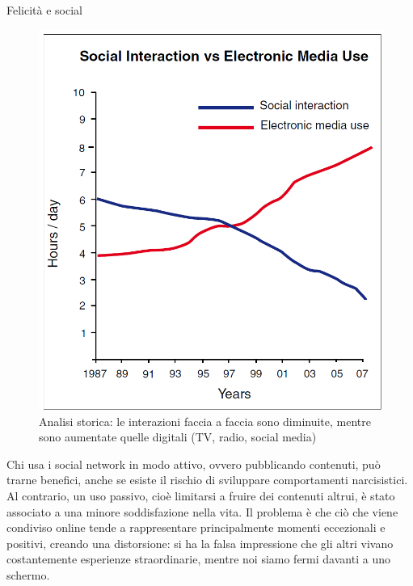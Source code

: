 \documentclass[12pt]{book} %
\begin{document}
\needspace{4cm}
\begin{mdframed}[linewidth=1pt]
Felicità e social

\begin{figure}
  \centering
  \includegraphics[width=0.95\linewidth]{images/Libro-img056.png}
  \caption{Analisi storica: le interazioni faccia a faccia sono diminuite, mentre sono aumentate quelle digitali (TV, radio, social media)\protect{}}
\end{figure}

Chi usa i social network in modo attivo, ovvero pubblicando contenuti, può trarne benefici, anche se esiste il rischio di sviluppare comportamenti narcisistici. Al contrario, un uso passivo, cioè limitarsi a fruire dei contenuti altrui, è stato associato a una minore soddisfazione nella vita. Il problema è che ciò che viene condiviso online tende a rappresentare principalmente momenti eccezionali e positivi, creando una distorsione: si ha la falsa impressione che gli altri vivano costantemente esperienze straordinarie, mentre noi siamo fermi davanti a uno schermo.


\end{mdframed}
\end{document}

